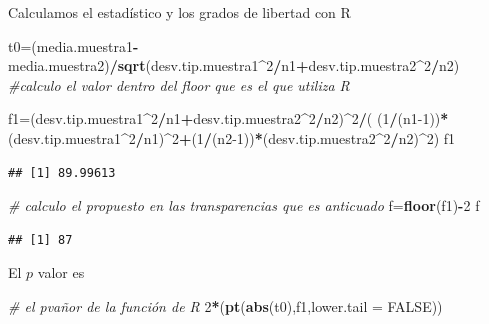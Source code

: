 \documentclass[
]{article}
\newenvironment{Shaded}{\begin{snugshade}}{\end{snugshade}}
\newcommand{\CommentTok}[1]{\textcolor[rgb]{0.56,0.35,0.01}{\textit{#1}}}
\newcommand{\DataTypeTok}[1]{\textcolor[rgb]{0.13,0.29,0.53}{#1}}
\newcommand{\DecValTok}[1]{\textcolor[rgb]{0.00,0.00,0.81}{#1}}
\newcommand{\KeywordTok}[1]{\textcolor[rgb]{0.13,0.29,0.53}{\textbf{#1}}}
\newcommand{\NormalTok}[1]{#1}
\newcommand{\OperatorTok}[1]{\textcolor[rgb]{0.81,0.36,0.00}{\textbf{#1}}}
\newcommand{\OtherTok}[1]{\textcolor[rgb]{0.56,0.35,0.01}{#1}}
\begin{document}
Calculamos el estadístico y los grados de libertad con R

\begin{Shaded}
\begin{Highlighting}[]
\NormalTok{t0=(media.muestra1}\OperatorTok{{-}}\NormalTok{media.muestra2)}\OperatorTok{/}\KeywordTok{sqrt}\NormalTok{(desv.tip.muestra1}\OperatorTok{\^{}}\DecValTok{2}\OperatorTok{/}\NormalTok{n1}\OperatorTok{+}\NormalTok{desv.tip.muestra2}\OperatorTok{\^{}}\DecValTok{2}\OperatorTok{/}\NormalTok{n2)}
\CommentTok{\#calculo el valor dentro del floor que es el que utiliza R}

\NormalTok{f1=(desv.tip.muestra1}\OperatorTok{\^{}}\DecValTok{2}\OperatorTok{/}\NormalTok{n1}\OperatorTok{+}\NormalTok{desv.tip.muestra2}\OperatorTok{\^{}}\DecValTok{2}\OperatorTok{/}\NormalTok{n2)}\OperatorTok{\^{}}\DecValTok{2}\OperatorTok{/}\NormalTok{(}
\NormalTok{  (}\DecValTok{1}\OperatorTok{/}\NormalTok{(n1}\DecValTok{{-}1}\NormalTok{))}\OperatorTok{*}\NormalTok{(desv.tip.muestra1}\OperatorTok{\^{}}\DecValTok{2}\OperatorTok{/}\NormalTok{n1)}\OperatorTok{\^{}}\DecValTok{2}\OperatorTok{+}\NormalTok{(}\DecValTok{1}\OperatorTok{/}\NormalTok{(n2}\DecValTok{{-}1}\NormalTok{))}\OperatorTok{*}\NormalTok{(desv.tip.muestra2}\OperatorTok{\^{}}\DecValTok{2}\OperatorTok{/}\NormalTok{n2)}\OperatorTok{\^{}}\DecValTok{2}\NormalTok{)}
\NormalTok{f1}
\end{Highlighting}
\end{Shaded}

\begin{verbatim}
## [1] 89.99613
\end{verbatim}

\begin{Shaded}
\begin{Highlighting}[]
\CommentTok{\# calculo el propuesto en las transparencias que es anticuado}
\NormalTok{f=}\KeywordTok{floor}\NormalTok{(f1)}\OperatorTok{{-}}\DecValTok{2}  
\NormalTok{f  }
\end{Highlighting}
\end{Shaded}

\begin{verbatim}
## [1] 87
\end{verbatim}

El \(p\) valor es

\begin{Shaded}
\begin{Highlighting}[]
\CommentTok{\# el pvañor de la función de R}
\DecValTok{2}\OperatorTok{*}\NormalTok{(}\KeywordTok{pt}\NormalTok{(}\KeywordTok{abs}\NormalTok{(t0),f1,}\DataTypeTok{lower.tail =} \OtherTok{FALSE}\NormalTok{))}
\end{Highlighting}
\end{Shaded}
\end{document}
